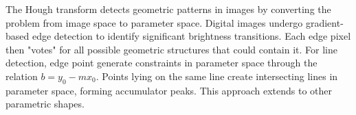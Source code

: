 The Hough transform detects geometric patterns in images by converting the problem from image space to parameter space. Digital images undergo gradient-based edge detection to identify significant brightness transitions. Each edge pixel then "votes" for all possible geometric structures that could contain it. For line detection, edge point generate constraints in parameter space through the relation $b = y_0 - mx_0$. Points lying on the same line create intersecting lines in parameter space, forming accumulator peaks. This approach extends to other parametric shapes.